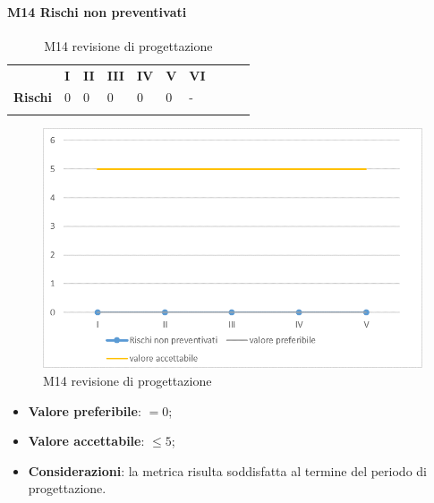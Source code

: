 \paragraph{M14 Rischi non preventivati} \mbox{}
\begin{longtable}[H!] {						
		>{}p{50mm}  		
		>{}p{8mm}
		>{}p{8mm}		
		>{}p{8mm}		
		>{}p{8mm}		
		>{}p{8mm}		
		>{}p{8mm}
		>{}p{8mm}
		>{}p{8mm}
		>{}p{8mm}
	}
	\rowcolor{gray!50}
	\textbf{} & \textbf{I} & \textbf{II} & \textbf{III} & \textbf{IV} & \textbf{V} & \textbf{VI} \TBstrut \\ [2mm]
	\textbf{Rischi} & 0 & 0 & 0 & 0 & 0 & - \TBstrut \\ [2mm]
	\rowcolor{white}
	\caption{M14 revisione di progettazione}
\end{longtable}
\begin{figure}[H] 	
\includegraphics[width=\linewidth]{./img/grafici/RP11.png}	
\caption{M14 revisione di progettazione}	
\end{figure}
\begin{itemize}
	\item \textbf{Valore preferibile}: $=0$;
	\item \textbf{Valore accettabile}: $\le 5$;
	\item \textbf{Considerazioni}: la metrica risulta soddisfatta al termine del periodo di progettazione.
\end{itemize}
